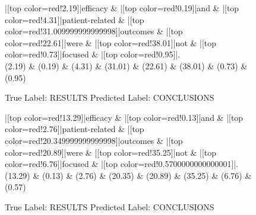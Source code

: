 \documentclass[a4paper, landscape]{article}
\begin{document}
\clearpage
\begin{figure}
\begin{center}
\begin{dependency}
\begin{deptext}
|[top color=red!2.19]|efficacy \& |[top color=red!0.19]|and \& |[top color=red!4.31]|patient-related \& |[top color=red!31.009999999999998]|outcomes \& |[top color=red!22.61]|were \& |[top color=red!38.01]|not \& |[top color=red!0.73]|focused \& |[top color=red!0.95]|.\\
(2.19) \& (0.19) \& (4.31) \& (31.01) \& (22.61) \& (38.01) \& (0.73) \& (0.95)\\
\end{deptext}
\end{dependency}
\end{center}
\caption{True Label: RESULTS Predicted Label: CONCLUSIONS}
\end{figure}
\clearpage
\begin{figure}
\begin{center}
\begin{dependency}
\begin{deptext}
|[top color=red!13.29]|efficacy \& |[top color=red!0.13]|and \& |[top color=red!2.76]|patient-related \& |[top color=red!20.349999999999998]|outcomes \& |[top color=red!20.89]|were \& |[top color=red!35.25]|not \& |[top color=red!6.76]|focused \& |[top color=red!0.5700000000000001]|.\\
(13.29) \& (0.13) \& (2.76) \& (20.35) \& (20.89) \& (35.25) \& (6.76) \& (0.57)\\
\end{deptext}
\end{dependency}
\end{center}
\caption{True Label: RESULTS Predicted Label: CONCLUSIONS}
\end{figure}
\clearpage
\end{document}

